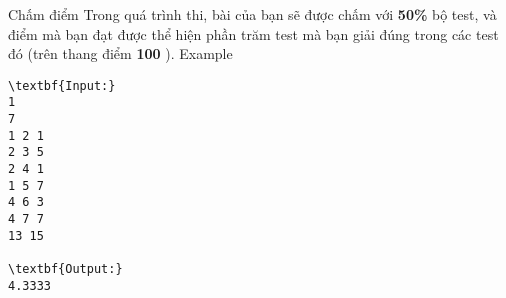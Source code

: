 Chấm điểm  
Trong quá trình thi, bài của bạn sẽ được chấm với   \textbf{    50\%   }   bộ test, và điểm mà bạn đạt được thể hiện phần trăm test mà bạn giải đúng trong các test đó (trên thang điểm   \textbf{    100   }   ).
   Example  
\begin{verbatim}
\textbf{Input:}
1
7
1 2 1
2 3 5
2 4 1
1 5 7
4 6 3
4 7 7
13 15

\textbf{Output:}
4.3333

\end{verbatim}